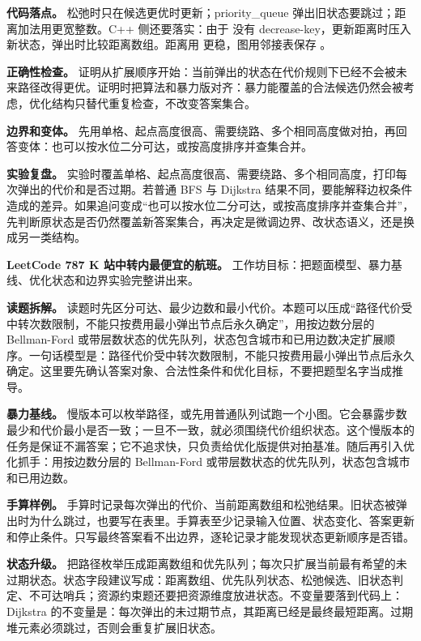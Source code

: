 \textbf{代码落点。} 松弛时只在候选更优时更新；priority\_queue 弹出旧状态要跳过；距离加法用更宽整数。C++ 侧还要落实：由于  没有 decrease-key，更新距离时压入新状态，弹出时比较距离数组。距离用  更稳，图用邻接表保存 。

\textbf{正确性检查。} 证明从扩展顺序开始：当前弹出的状态在代价规则下已经不会被未来路径改得更优。证明时把算法和暴力版对齐：暴力能覆盖的合法候选仍然会被考虑，优化结构只替代重复检查，不改变答案集合。

\textbf{边界和变体。} 先用单格、起点高度很高、需要绕路、多个相同高度做对拍，再回答变体：也可以按水位二分可达，或按高度排序并查集合并。

\textbf{实验复盘。} 实验时覆盖单格、起点高度很高、需要绕路、多个相同高度，打印每次弹出的代价和是否过期。若普通 BFS 与 Dijkstra 结果不同，要能解释边权条件造成的差异。如果追问变成“也可以按水位二分可达，或按高度排序并查集合并”，先判断原状态是否仍然覆盖新答案集合，再决定是微调边界、改状态语义，还是换成另一类结构。

\noindent\textbf{LeetCode 787 K 站中转内最便宜的航班。} 工作坊目标：把题面模型、暴力基线、优化状态和边界实验完整讲出来。

\textbf{读题拆解。} 读题时先区分可达、最少边数和最小代价。本题可以压成“路径代价受中转次数限制，不能只按费用最小弹出节点后永久确定”，用按边数分层的 Bellman-Ford 或带层数状态的优先队列，状态包含城市和已用边数决定扩展顺序。一句话模型是：路径代价受中转次数限制，不能只按费用最小弹出节点后永久确定。这里要先确认答案对象、合法性条件和优化目标，不要把题型名字当成推导。

\textbf{暴力基线。} 慢版本可以枚举路径，或先用普通队列试跑一个小图。它会暴露步数最少和代价最小是否一致；一旦不一致，就必须围绕代价组织状态。这个慢版本的任务是保证不漏答案；它不追求快，只负责给优化版提供对拍基准。随后再引入优化抓手：用按边数分层的 Bellman-Ford 或带层数状态的优先队列，状态包含城市和已用边数。

\textbf{手算样例。} 手算时记录每次弹出的代价、当前距离数组和松弛结果。旧状态被弹出时为什么跳过，也要写在表里。手算表至少记录输入位置、状态变化、答案更新和停止条件。只写最终答案看不出边界，逐轮记录才能发现状态更新顺序是否错。

\textbf{状态升级。} 把路径枚举压成距离数组和优先队列；每次只扩展当前最有希望的未过期状态。状态字段建议写成：距离数组、优先队列状态、松弛候选、旧状态判定、不可达哨兵；资源约束题还要把资源维度放进状态。不变量要落到代码上：Dijkstra 的不变量是：每次弹出的未过期节点，其距离已经是最终最短距离。过期堆元素必须跳过，否则会重复扩展旧状态。

